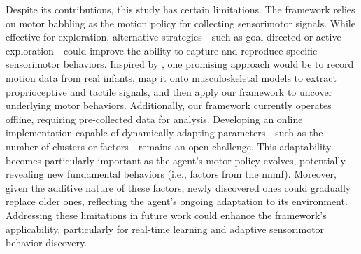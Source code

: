 Despite its contributions, this study has certain limitations. The framework relies on motor babbling as the motion policy for collecting sensorimotor signals. While effective for exploration, alternative strategies---such as goal-directed or active exploration---could improve the ability to capture and reproduce specific sensorimotor behaviors. Inspired by \cite{Kanazawa2023Openendedmovements}, one promising approach would be to record motion data from real infants, map it onto musculoskeletal models to extract proprioceptive and tactile signals, and then apply our framework to uncover underlying motor behaviors. Additionally, our framework currently operates offline, requiring pre-collected data for analysis. Developing an online implementation capable of dynamically adapting parameters---such as the number of clusters or factors---remains an open challenge. This adaptability becomes particularly important as the agent's motor policy evolves, potentially revealing new fundamental behaviors (i.e., factors from the \ac{nnmf}). Moreover, given the additive nature of these factors, newly discovered ones could gradually replace older ones, reflecting the agent’s ongoing adaptation to its environment. Addressing these limitations in future work could enhance the framework’s applicability, particularly for real-time learning and adaptive sensorimotor behavior discovery.


